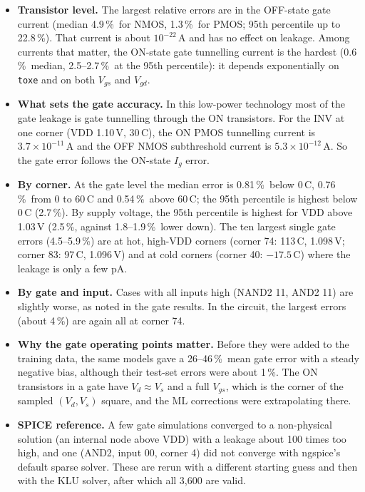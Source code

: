 \documentclass[10pt]{article}
\newcommand{\pct}{\,\%}
\begin{document}
\begin{itemize}
\item \textbf{Transistor level.} The largest relative errors are in the OFF-state gate current
(median 4.9\pct\ for NMOS, 1.3\pct\ for PMOS; 95th percentile up to 22.8\pct). That current is
about $10^{-22}$\,A and has no effect on leakage. Among currents that matter, the ON-state gate
tunnelling current is the hardest (0.6\pct\ median, 2.5--2.7\pct\ at the 95th percentile): it
depends exponentially on \texttt{toxe} and on both $V_{gs}$ and $V_{gd}$.
\item \textbf{What sets the gate accuracy.} In this low-power technology most of the gate leakage
is gate tunnelling through the ON transistors. For the INV at one corner (VDD 1.10\,V,
30\,\textdegree C), the ON PMOS tunnelling current is $3.7 \times 10^{-11}$\,A and the OFF NMOS
subthreshold current is $5.3 \times 10^{-12}$\,A. So the gate error follows the ON-state $I_g$
error.
\item \textbf{By corner.} At the gate level the median error is 0.81\pct\ below 0\,\textdegree C,
0.76\pct\ from 0 to 60\,\textdegree C and 0.54\pct\ above 60\,\textdegree C; the 95th percentile
is highest below 0\,\textdegree C (2.7\pct). By supply voltage, the 95th percentile is highest for
VDD above 1.03\,V (2.5\pct, against 1.8--1.9\pct\ lower down). The ten largest single gate errors
(4.5--5.9\pct) are at hot, high-VDD corners (corner 74: 113\,\textdegree C, 1.098\,V; corner 83:
97\,\textdegree C, 1.096\,V) and at cold corners (corner 40: $-17.5$\,\textdegree C) where the
leakage is only a few pA.
\item \textbf{By gate and input.} Cases with all inputs high (NAND2 11, AND2 11) are slightly
worse, as noted in the gate results. In the circuit, the largest errors (about 4\pct) are again
all at corner 74.
\item \textbf{Why the gate operating points matter.} Before they were added to the training data,
the same models gave a 26--46\pct\ mean gate error with a steady negative bias, although their
test-set errors were about 1\pct. The ON transistors in a gate have $V_d \approx V_s$ and a full
$V_{gs}$, which is the corner of the sampled $(V_d, V_s)$ square, and the ML corrections were
extrapolating there.
\item \textbf{SPICE reference.} A few gate simulations converged to a non-physical solution (an
internal node above VDD) with a leakage about 100 times too high, and one (AND2, input 00, corner
4) did not converge with ngspice's default sparse solver. These are rerun with a different
starting guess and then with the KLU solver, after which all 3,600 are valid.
\end{itemize}
\end{document}
